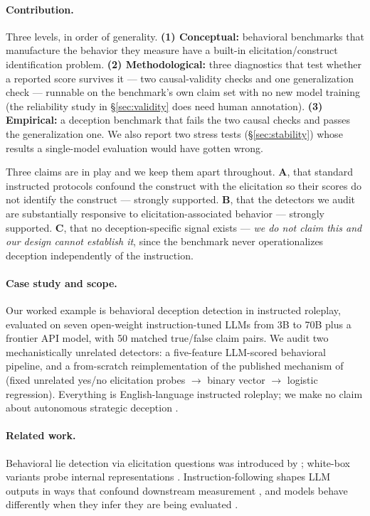 \paragraph{Contribution.} Three levels, in order of generality. \textbf{(1) Conceptual:} behavioral benchmarks that manufacture the behavior they measure have a built-in elicitation/construct identification problem. \textbf{(2) Methodological:} three diagnostics that test whether a reported score survives it --- two causal-validity checks and one generalization check --- runnable on the benchmark's own claim set with no new model training (the reliability study in §\ref{sec:validity} does need human annotation). \textbf{(3) Empirical:} a deception benchmark that fails the two causal checks and passes the generalization one. We also report two stress tests (§\ref{sec:stability}) whose results a single-model evaluation would have gotten wrong.

Three claims are in play and we keep them apart throughout. \textbf{A}, that standard instructed protocols confound the construct with the elicitation so their scores do not identify the construct --- strongly supported. \textbf{B}, that the detectors we audit are substantially responsive to elicitation-associated behavior --- strongly supported. \textbf{C}, that no deception-specific signal exists --- \emph{we do not claim this and our design cannot establish it}, since the benchmark never operationalizes deception independently of the instruction.



\paragraph{Case study and scope.} Our worked example is behavioral deception detection in instructed roleplay, evaluated on seven open-weight instruction-tuned LLMs from 3B to 70B plus a frontier API model, with 50 matched true/false claim pairs. We audit two mechanistically unrelated detectors: a five-feature LLM-scored behavioral pipeline, and a from-scratch reimplementation of the published mechanism of \citet{pacchiardi2023catch} (fixed unrelated yes/no elicitation probes $\to$ binary vector $\to$ logistic regression). Everything is English-language instructed roleplay; we make no claim about autonomous strategic deception \citep{hubinger2019risks, scheurer2024strategic, greenblatt2024alignment}.

\paragraph{Related work.} Behavioral lie detection via elicitation questions was introduced by \citet{pacchiardi2023catch}; white-box variants probe internal representations \citep{azaria2023internal, burns2022discovering, zou2023representation, li2024inference}. Instruction-following shapes LLM outputs in ways that confound downstream measurement \citep{sharma2023sycophancy, denison2024sycophancy, perez2022red}, and models behave differently when they infer they are being evaluated \citep{hubinger2024sleeper, greenblatt2024alignment}.


